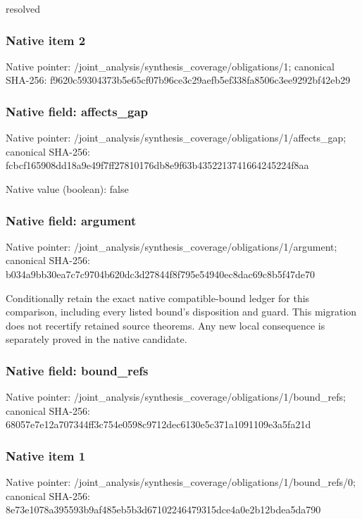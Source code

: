 \documentclass[10pt,a4paper]{article}
\begin{document}
\begingroup\raggedright\sloppy resolved\par\endgroup

\subsubsection{Native item 2}
Native pointer: /joint\_\allowbreak{}analysis/synthesis\_\allowbreak{}coverage/obligations/1; canonical SHA-256: f9620c59304373b5e65cf07b96ce3c29aefb5ef338fa8506c3ee9292bf42eb29

\subsubsection{Native field: affects\_\allowbreak{}gap}
Native pointer: /joint\_\allowbreak{}analysis/synthesis\_\allowbreak{}coverage/obligations/1/affects\_\allowbreak{}gap; canonical SHA-256: fcbcf165908dd18a9e49f7ff27810176db8e9f63b4352213741664245224f8aa

Native value (boolean): false

\subsubsection{Native field: argument}
Native pointer: /joint\_\allowbreak{}analysis/synthesis\_\allowbreak{}coverage/obligations/1/argument; canonical SHA-256: b034a9bb30ea7c7c9704b620dc3d27844f8f795e54940ec8dac69c8b5f47de70

\begingroup\raggedright\sloppy Conditionally retain the exact native compatible-bound ledger for this comparison,\allowbreak{} including every listed bound's disposition and guard. This migration does not recertify retained source theorems. Any new local consequence is separately proved in the native candidate.\par\endgroup

\subsubsection{Native field: bound\_\allowbreak{}refs}
Native pointer: /joint\_\allowbreak{}analysis/synthesis\_\allowbreak{}coverage/obligations/1/bound\_\allowbreak{}refs; canonical SHA-256: 68057e7e12a707344ff3c754e0598c9712dec6130e5c371a1091109e3a5fa21d

\subsubsection{Native item 1}
Native pointer: /joint\_\allowbreak{}analysis/synthesis\_\allowbreak{}coverage/obligations/1/bound\_\allowbreak{}refs/0; canonical SHA-256: 8e73e1078a395593b9af485eb5b3d67102246479315dce4a0e2b12bdea5da790
\end{document}
